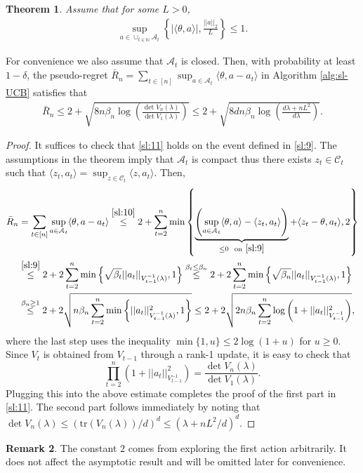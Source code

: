 \documentclass[letterpaper,11pt,openright,openany]{book}
\numberwithin{equation}{section}
\theoremstyle{plain}
\newtheorem{Th}{Theorem}[section]
\theoremstyle{definition}
\newtheorem{Rem}[Th]{Remark}
\def\N{{\mathbb N}}
\def\t{{\theta}}
\begin{document}
\begin{Th}
Assume that for some $L>0$, 
\begin{align}
\sup_{a\in\cup_{t\in\N}\mathcal A_t}\left\{|\langle\t, a\rangle|, \frac{||a||_2}{L}\right\}\leq 1. \label{sl:10}
\end{align}
\end{Th}
For convenience we also assume that $\mathcal A_t$ is closed. Then, with probability at least $1-\delta$, the pseudo-regret $\bar{R}_n=\sum_{t\in [n]}\sup_{a\in\mathcal A_t}\langle\t, a-a_t\rangle$ in Algorithm \ref{alg:sl-UCB} satisfies that
\begin{align}
\bar{R}_n\leq 2+\sqrt{8n\beta_n\log\left(\frac{\det V_n(\lambda)}{\det V_1(\lambda)}\right)}\leq 2+\sqrt{8dn\beta_n\log\left(\frac{d\lambda+nL^2}{d\lambda}\right)}. \label{sl:11}
\end{align}
\begin{proof}
It suffices to check that \eqref{sl:11} holds on the event defined in \eqref{sl:9}. The assumptions in the theorem imply that $\mathcal A_t$ is compact thus there exists $z_t\in\mathcal C_t$ such that $\langle z_t, a_t\rangle = \sup_{z\in\mathcal C_t}\langle z, a_t\rangle$. Then,
\begin{align*}
\bar{R}_n& = \sum_{t\in [n]}\sup_{a\in\mathcal A_t}\langle\t, a-a_t\rangle\stackrel{\eqref{sl:10}}{\leq} 2+ \sum_{t=2}^n\min\left\{\underbrace{\left(\sup_{a\in\mathcal A_t}\langle\t, a\rangle-\langle z_t, a_t\rangle\right)}_{\leq 0 \ \text{ on}\ \eqref{sl:9}}+\langle z_t-\t, a_t\rangle, 2\right\}\\
&\stackrel{\eqref{sl:9}}{\leq} 2+2\sum_{t=2}^n \min\left\{\sqrt{\beta_t}||a_t||_{V^{-1}_{t-1}(\lambda)}, 1\right\}\stackrel{\beta_t\leq\beta_n}{\leq} 2+2\sum_{t=2}^n \min\left\{\sqrt{\beta_n}||a_t||_{V^{-1}_{t-1}(\lambda)}, 1\right\}\\
&\stackrel{\beta_n\geq 1}{\leq} 2+2\sqrt{n\beta_n\sum_{t=2}^n\min\left\{||a_t||^2_{V^{-1}_{t-1}(\lambda)}, 1\right\}}\leq 2+2\sqrt{2n\beta_n\sum_{t=2}^n\log \left(1+||a_t||^2_{V^{-1}_{t-1}}\right)},
\end{align*} 
where the last step uses the inequality $\min\{1, u\}\leq 2\log(1+u)$ for $u\geq 0$. Since $V_t$ is obtained from $V_{t-1}$ through a rank-1 update, it is easy to check that $$\prod_{t=2}^n \left(1+||a_t||^2_{V^{-1}_{t-1}}\right)=\frac{\det V_n(\lambda)}{\det V_1(\lambda)}.$$Plugging this into the above estimate completes the proof of the first part in \eqref{sl:11}. The second part follows immediately by noting that $\det V_n(\lambda)\leq (\text{tr}(V_n(\lambda))/d)^d\leq (\lambda + nL^2/d)^d$.
\end{proof}
\begin{Rem}
The constant $2$ comes from exploring the first action arbitrarily. It does not affect the asymptotic result and will be omitted later for convenience. 
\end{Rem}
\end{document}
